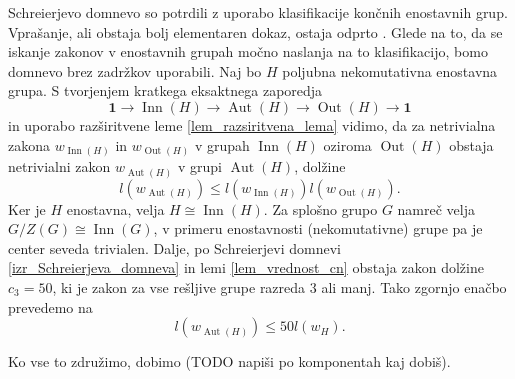 Schreierjevo domnevo so potrdili z uporabo klasifikacije končnih enostavnih grup. Vprašanje, ali obstaja bolj elementaren dokaz, ostaja odprto \cite[str.~133]{Dixon_Mortimer_1996}.  
Glede na to, da se iskanje zakonov v enostavnih grupah močno naslanja na to klasifikacijo, bomo domnevo brez zadržkov uporabili. Naj bo $H$ poljubna nekomutativna enostavna grupa. 
S tvorjenjem kratkega eksaktnega zaporedja \begin{equation*}
    \mathbf{1} \to \operatorname{Inn}(H)  \to \operatorname{Aut}(H)  \to  \operatorname{Out}(H)  \to  \mathbf{1}
\end{equation*}  
in uporabo razširitvene leme \ref{lem_razsiritvena_lema} vidimo, da za netrivialna zakona $w_{\operatorname{Inn}(H) }$ in $w_{\operatorname{Out}(H) }$ v grupah $\operatorname{Inn}(H) $ oziroma $\operatorname{Out}(H) $ obstaja netrivialni zakon $w_{\operatorname{Aut}(H) }$ v grupi $\operatorname{Aut}(H) $, dolžine \begin{equation*}
    l(w_{\operatorname{Aut}(H) }) \le  l(w_{\operatorname{Inn}(H) }) l (w_{ \operatorname{Out}(H) }).
    \end{equation*}    
Ker je $H$ enostavna, velja $H \cong \operatorname{Inn}(H)$. Za splošno grupo $G$ namreč velja $ G / Z(G) \cong \operatorname{Inn}(G)$, v primeru enostavnosti (nekomutativne) grupe pa je center seveda trivialen. Dalje, po Schreierjevi domnevi \ref{izr_Schreierjeva_domneva} in lemi \ref{lem_vrednost_cn} obstaja zakon dolžine $c_3 = 50$, ki je zakon za vse rešljive grupe razreda $3$ ali manj.
Tako zgornjo enačbo prevedemo na \begin{equation*}
    l(w_{\operatorname{Aut}(H) }) \le  50 l(w_H).
\end{equation*}  


Ko vse to združimo, dobimo (TODO napiši po komponentah kaj dobiš).